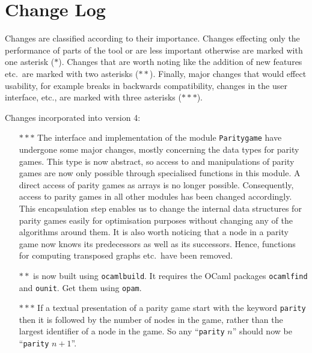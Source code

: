 \section{Change Log}

Changes are classified according to their importance. Changes effecting only the performance of
parts of the tool or are less important otherwise are marked with one asterisk ($\ast$). Changes
that are worth noting like the addition of new features etc.\ are marked with two asterisks 
($\ast\ast$). Finally, major changes that would effect usability, for example breaks in backwards
compatibility, changes in the user interface, etc., are marked with three asterisks ($\ast\ast\ast$).

Changes incorporated into version 4:
\begin{itemize}
\item[$\ast\ast\ast$] The interface and implementation of the module \texttt{Paritygame} have undergone some major changes,
     mostly concerning the data types for parity games. This type is now abstract, so access to and manipulations of parity games
     are now only possible through specialised functions in this module. A direct access of parity games as arrays is no longer
     possible. Consequently, access to parity games in all other modules has been changed accordingly. This encapsulation step 
     enables us to change the internal data structures for parity games easily for optimisation purposes without changing any of 
     the algorithms around them. It is also worth noticing that a node in a parity game now knows its predecessors as well as its
     successors. Hence, functions for computing transposed graphs etc.\ have been removed.
\item[$\ast\ast$] \pgsolver is now built using \texttt{ocamlbuild}. It requires the OCaml packages \texttt{ocamlfind} and \texttt{ounit}.
     Get them using \texttt{opam}.
\item[$\ast\ast\ast$] If a textual presentation of a parity game start with the keyword \texttt{parity} then it is followed by the number of
     nodes in the game, rather than the largest identifier of a node in the game. So any ``\texttt{parity} $n$'' should now be 
     ``\texttt{parity} $n+1$''. 
\end{itemize}

